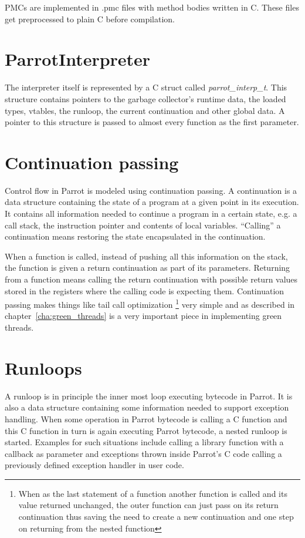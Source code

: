 \documentclass[bachelor,english]{hgbthesis}
\begin{document}
PMCs are implemented in .pmc files with method bodies written in C. These files get preprocessed to plain C before compilation.

\section{ParrotInterpreter}

The interpreter itself is represented by a C struct called \textit{parrot\_interp\_t}. This structure contains pointers to the garbage collector's runtime data, the loaded types, vtables, the runloop, the current continuation and other global data. A pointer to this structure is passed to almost every function as the first parameter.

\section{Continuation passing}

Control flow in Parrot is modeled using continuation passing. A continuation is a data structure containing the state of a program at a given point in its execution. It contains all information needed to continue a program in a certain state, e.g. a call stack, the instruction pointer and contents of local variables. ``Calling'' a continuation means restoring the state encapsulated in the continuation.

When a function is called, instead of pushing all this information on the stack, the function is given a return continuation as part of its parameters. Returning from a function means calling the return continuation with possible return values stored in the registers where the calling code is expecting them. Continuation passing makes things like tail call optimization \footnote{When as the last statement of a function another function is called and its value returned unchanged, the outer function can just pass on its return continuation thus saving the need to create a new continuation and one step on returning from the nested function} very simple and as described in chapter~\ref{cha:green_threads} is a very important piece in implementing green threads.

\section{Runloops}
\label{sec:Runloops}

A runloop is in principle the inner most loop executing bytecode in Parrot. It is also a data structure containing some information needed to support exception handling. When some operation in Parrot bytecode is calling a C function and this C function in turn is again executing Parrot bytecode, a nested runloop is started. Examples for such situations include calling a library function with a callback as parameter and exceptions thrown inside Parrot's C code calling a previously defined exception handler in user code.
\end{document}
